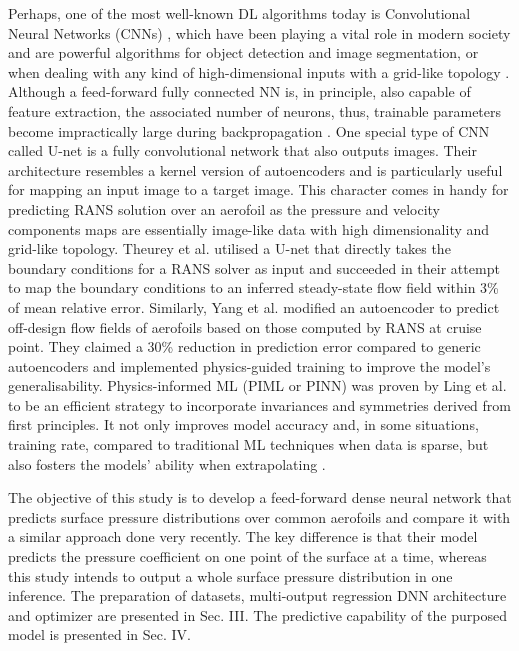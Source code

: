 \documentclass[11pt]{article}
\begin{document}
Perhaps, one of the most well-known DL algorithms today is Convolutional Neural Networks (CNNs) \cite{LeCun1989HandwrittenLearning}, which have been playing a vital role in modern society and are powerful algorithms for object detection and image segmentation, or when dealing with any kind of high-dimensional inputs with a grid-like topology \cite{Bhatnagar2019PredictionNetworks}. Although a feed-forward fully connected NN is, in principle, also capable of feature extraction, the associated number of neurons, thus, trainable parameters become impractically large during backpropagation \cite{Rumelhart1986LearningErrors}. One special type of CNN called U-net \cite{Ronneberger2015U-Net:Segmentation} is a fully convolutional network that also outputs images. Their architecture resembles a kernel version of autoencoders and is particularly useful for mapping an input image to a target image. This character comes in handy for predicting RANS solution over an aerofoil as the pressure and velocity components maps are essentially image-like data with high dimensionality and grid-like topology. Theurey et al. \cite{Thuerey2020DeepFlows} utilised a U-net that directly takes the boundary conditions for a RANS solver as input and succeeded in their attempt to map the boundary conditions to an inferred steady-state flow field within 3\% of mean relative error. Similarly, Yang et al. \cite{Yang2022FlowfieldAutoencoder} modified an autoencoder to predict off-design flow fields of aerofoils based on those computed by RANS at cruise point. They claimed a 30\% reduction in prediction error compared to generic autoencoders and implemented physics-guided training to improve the model’s generalisability. Physics-informed ML (PIML or PINN) was proven by Ling et al. \cite{Ling2016ReynoldsInvariance} to be an efficient strategy to incorporate invariances and symmetries derived from first principles. It not only improves model accuracy and, in some situations, training rate, compared to traditional ML techniques when data is sparse, but also fosters the models’ ability when extrapolating \cite{Wang2017Physics-informedData, Raissi2019Physics-informedEquations}.

The objective of this study is to develop a feed-forward dense neural network that predicts surface pressure distributions over common aerofoils and compare it with a similar approach \cite{Sabater2022FastTechniques} done very recently. The key difference is that their model predicts the pressure coefficient on one point of the surface at a time, whereas this study intends to output a whole surface pressure distribution in one inference. The preparation of datasets, multi-output regression DNN architecture and optimizer are presented in Sec. III. The predictive capability of the purposed model is presented in Sec. IV.\\
\\
\end{document}
